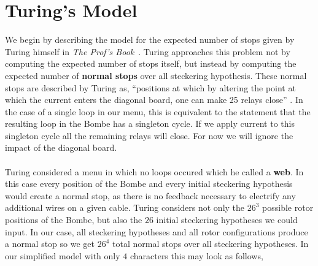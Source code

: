 \section{Turing's Model}
We begin by describing the model for the expected number of stops
given by Turing himself in \emph{The Prof's Book}~\cite[pp.~112--116]{Turing1940ProfBook}. Turing approaches this
problem not by computing the expected number of stops itself, but
instead by computing the expected number of {\bf{normal stops}} over
all steckering hypothesis. These normal stops are described by Turing
as, ``positions at which by altering the point at which the current
enters the diagonal board, one can make 25 relays close'' \cite[p.~112]{Turing1940ProfBook}. In the
case of a single loop in our menu, this is equivalent to the
statement that the resulting loop in the Bombe has a singleton cycle.
If we apply current to this singleton cycle all the remaining relays
will close. For now we will ignore the impact of the diagonal board.
\\\\Turing considered a menu in which no loops occured which he
called a {\bf{web}}. In this case every position of the Bombe and
every initial steckering hypothesis would create a normal stop, as
there is no feedback necessary to electrify any additional wires on a
given cable. Turing considers not only the $26^3$ possible rotor
positions of the Bombe, but also the $26$ initial steckering
hypotheses we could input. In our case, all steckering hypotheses and
all rotor configurations produce a normal stop so we get $26^4$ total
normal stops over all steckering hypotheses. In our simplified model
with only $4$ characters this may look as follows,

